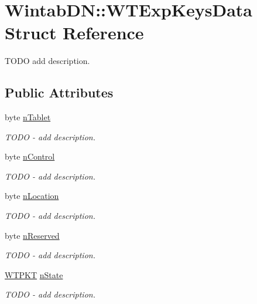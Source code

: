 \hypertarget{struct_wintab_d_n_1_1_w_t_exp_keys_data}{
\section{WintabDN::WTExpKeysData Struct Reference}
\label{struct_wintab_d_n_1_1_w_t_exp_keys_data}
}


TODO add description.  


\subsection*{Public Attributes}
\begin{DoxyCompactItemize}
\item 
byte \hyperlink{struct_wintab_d_n_1_1_w_t_exp_keys_data_a9672ec46f24431011506221a0907b9f1}{nTablet}
\begin{DoxyCompactList}\small\item\em TODO -\/ add description. \item\end{DoxyCompactList}\item 
byte \hyperlink{struct_wintab_d_n_1_1_w_t_exp_keys_data_a637276ea56c52346dbbe17ca6689318e}{nControl}
\begin{DoxyCompactList}\small\item\em TODO -\/ add description. \item\end{DoxyCompactList}\item 
byte \hyperlink{struct_wintab_d_n_1_1_w_t_exp_keys_data_a29778f2d536164e9299dc9cb6effb89f}{nLocation}
\begin{DoxyCompactList}\small\item\em TODO -\/ add description. \item\end{DoxyCompactList}\item 
byte \hyperlink{struct_wintab_d_n_1_1_w_t_exp_keys_data_ae75a2979fd97b1283dbe3ad657cbd3ee}{nReserved}
\begin{DoxyCompactList}\small\item\em TODO -\/ add description. \item\end{DoxyCompactList}\item 
\hyperlink{class_wintab_d_n_1_1_w_t_p_k_t}{WTPKT} \hyperlink{struct_wintab_d_n_1_1_w_t_exp_keys_data_a2755fd9dd04805f4d3989a66ee309bf2}{nState}
\begin{DoxyCompactList}\small\item\em TODO -\/ add description. \item\end{DoxyCompactList}\end{DoxyCompactItemize}



